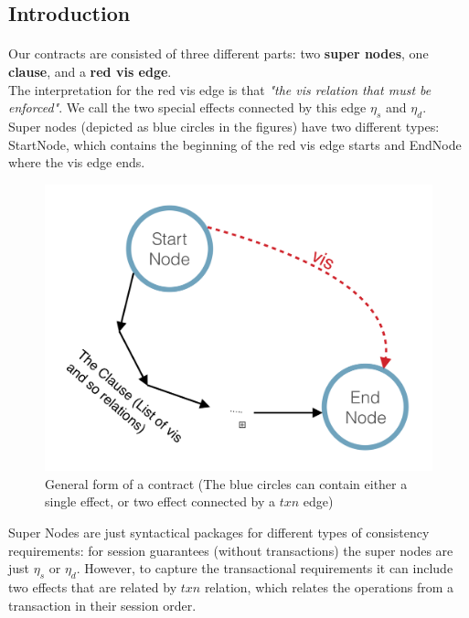 \documentclass[10, letterpaper]{article}
\begin{document}
\subsection*{Introduction} 
\paragraph{}
Our contracts are consisted of three different parts: two {\bf super nodes}, one {\bf clause}, and a {\bf red vis edge}. \\ 
The interpretation for the red vis edge is that  \emph{"the vis relation that must be enforced"}. We call the two special effects connected by this edge $\eta_s$ and $\eta_d$. \\
Super nodes (depicted as blue circles in the figures) have two different types: StartNode, which contains the beginning of the red vis edge starts and EndNode where the vis edge ends. \\
\begin {figure} [h]
\centering
\includegraphics [scale=0.25] {general.png} 
\caption {General form of a contract (The blue circles can contain either a single effect, or two effect connected by a $txn$ edge) }
\end {figure}


Super Nodes are just syntactical packages for different types of consistency requirements: for session guarantees (without transactions) the super nodes are just $\eta_s$ or $\eta_d$. However, to capture  the transactional requirements it can include two effects that are related by $txn$ relation, which relates the operations from a transaction in their session order. 
\end{document}
